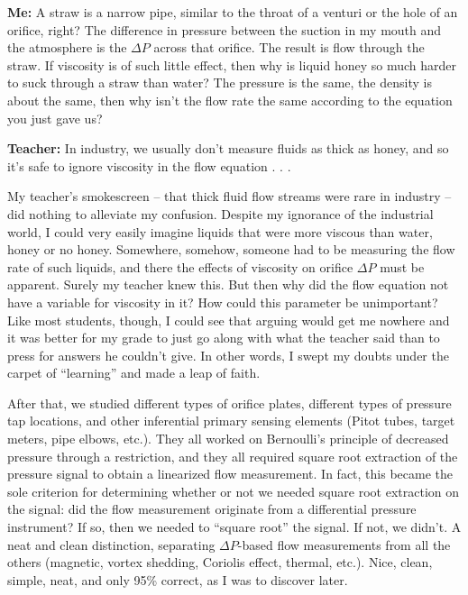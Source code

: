 \vskip 10pt
{\narrower \noindent
\textbf{Me:} A straw is a narrow pipe, similar to the throat of a venturi or the hole of an orifice, right?  The difference in pressure between the suction in my mouth and the atmosphere is the $\Delta P$ across that orifice.  The result is flow through the straw.  If viscosity is of such little effect, then why is liquid honey so much harder to suck through a straw than water?  The pressure is the same, the density is about the same, then why isn't the flow rate the same according to the equation you just gave us?
\par}

\vskip 10pt
{\narrower \noindent
\textbf{Teacher:} In industry, we usually don't measure fluids as thick as honey, and so it's safe to ignore viscosity in the flow equation . . .
\par}

\vskip 10pt

My teacher's smokescreen -- that thick fluid flow streams were rare in industry -- did nothing to alleviate my confusion.  Despite my ignorance of the industrial world, I could very easily imagine liquids that were more viscous than water, honey or no honey.  Somewhere, somehow, someone had to be measuring the flow rate of such liquids, and there the effects of viscosity on orifice $\Delta P$ must be apparent.  Surely my teacher knew this.  But then why did the flow equation not have a variable for viscosity in it?  How could this parameter be unimportant?  Like most students, though, I could see that arguing would get me nowhere and it was better for my grade to just go along with what the teacher said than to press for answers he couldn't give.  In other words, I swept my doubts under the carpet of ``learning'' and made a leap of faith.

After that, we studied different types of orifice plates, different types of pressure tap locations, and other inferential primary sensing elements (Pitot tubes, target meters, pipe elbows, etc.).  They all worked on Bernoulli's principle of decreased pressure through a restriction, and they all required square root extraction of the pressure signal to obtain a linearized flow measurement.  In fact, this became the sole criterion for determining whether or not we needed square root extraction on the signal: did the flow measurement originate from a differential pressure instrument?  If so, then we needed to ``square root'' the signal.  If not, we didn't.  A neat and clean distinction, separating $\Delta P$-based flow measurements from all the others (magnetic, vortex shedding, Coriolis effect, thermal, etc.).  Nice, clean, simple, neat, and only 95\% correct, as I was to discover later. 

